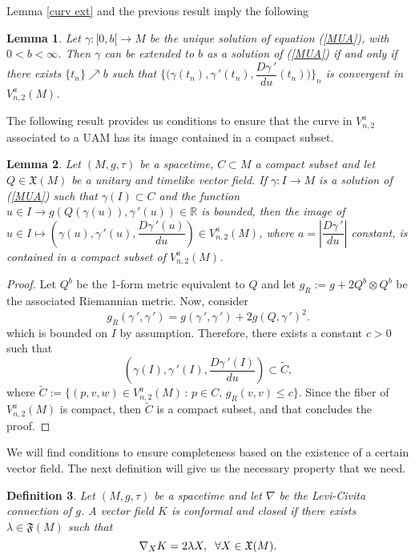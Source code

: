 \documentclass[11pt]{book}
\newtheorem{defi}{Definition}[chapter]
\newtheorem{lem}[defi]{Lemma}
\def\R{\mathbb R}
\def\F{\mathfrak F}
\def\x{\mathfrak X}
\begin{document}
Lemma \ref{curv ext} and the previous result imply the following
\begin{lem}
	Let $\gamma:[0,b[ \to M$ be the unique solution of equation (\ref{MUA}), with $0<b<\infty$.
	Then $\gamma$ can be extended to $b$ as a solution of (\ref{MUA}) if and only if there exists $\{t_n\}\nearrow b$ such that $\{\big(\gamma(t_n),\gamma{\,'}(t_n),\dfrac{D\gamma{\,'}}{du}(t_n)\big)\}_n$ is convergent in $V_{n,2}^a(M)$.
\end{lem}

The following result provides us conditions to ensure that the curve in $V_{n,2}^a$ associated to a UAM has its image contained in a compact subset.
\begin{lem}\label{lem curv 3}
	Let $(M,g,\tau)$ be a spacetime, $C\subset M$ a compact subset and let $Q\in \x(M)$ be a unitary and timelike vector field.	If $\gamma:I\to M$ is a solution of {\rm (\ref{MUA})} such that $\gamma(I)\subset C$ and the function $u\in I \to g(Q(\gamma (u)),\gamma{\,'}(u))\in \R$ is bounded, then the image of $u\in I\longmapsto \left( \gamma(u), \gamma{\,'}(u), \dfrac{D\gamma{\,'}(u)}{du} \right)\in V_{n,2}^a(M)$, where $a=\left|\dfrac{D\gamma{\,'}}{du}\right|$ constant, is contained in a compact subset of $V_{n,2}^a(M)$. 
\end{lem}
\begin{proof}
	Let $Q^b$ be the 1-form metric equivalent to $Q$ and let $g_R:=g+2Q^b \otimes Q^b$ be the associated Riemannian metric. Now, consider
	\[
	g_R(\gamma{\,'},\gamma{\,'})=g(\gamma{\,'},\gamma{\,'})+ 2g(Q,\gamma{\,'})^2.
	\]
	which is bounded on $I$ by assumption. Therefore, there exists a constant $c>0$ such that
	\[
	\left( \gamma(I), \gamma{\,'}(I), \dfrac{D\gamma{\,'}(I)}{du} \right) \subset \tilde{C},
	\]
	where $\tilde{C}:=\{(p,v,w)\in V_{n,2}^a(M) \, : \, p\in C , \, g_R(v,v)\le c\}$. Since the fiber of $V_{n,2}^a (M)$ is compact, then $\tilde{C}$ is a compact subset, and that concludes the proof.
\end{proof}

We will find conditions to ensure completeness based on the existence of a certain vector field. The next definition will give us the necessary property that we need.

\begin{defi}
	Let $(M,g,\tau)$ be a spacetime and let $\nabla$ be the Levi-Civita connection of $g$.
	A vector field $K$ is conformal and closed if there exists $\lambda\in \F(M)$ such that
	\begin{equation}\label{conf and cerr}
		\nabla_X K=2\lambda X ,\hspace{2mm} \forall X\in\x(M).
	\end{equation}
\end{defi}
\end{document}
